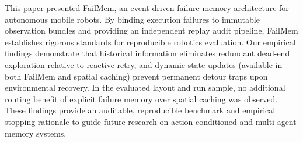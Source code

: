 This paper presented FailMem, an event-driven failure memory architecture for autonomous mobile robots. By binding execution failures to immutable observation bundles and providing an independent replay audit pipeline, FailMem establishes rigorous standards for reproducible robotics evaluation. Our empirical findings demonstrate that historical information eliminates redundant dead-end exploration relative to reactive retry, and dynamic state updates (available in both FailMem and spatial caching) prevent permanent detour traps upon environmental recovery. In the evaluated layout and run sample, no additional routing benefit of explicit failure memory over spatial caching was observed. These findings provide an auditable, reproducible benchmark and empirical stopping rationale to guide future research on action-conditioned and multi-agent memory systems.
